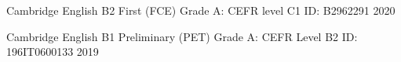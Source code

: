 

\begin{cvhonors}

  \cvhonor
    {Cambridge English B2 First (FCE)} %
    {Grade A: CEFR level C1} %
    {ID: B2962291} %
    {2020} %

  \cvhonor
    {Cambridge English B1 Preliminary (PET)} %
    {Grade A: CEFR Level B2} %
    {ID: 196IT0600133} %
    {2019} %

\end{cvhonors}
